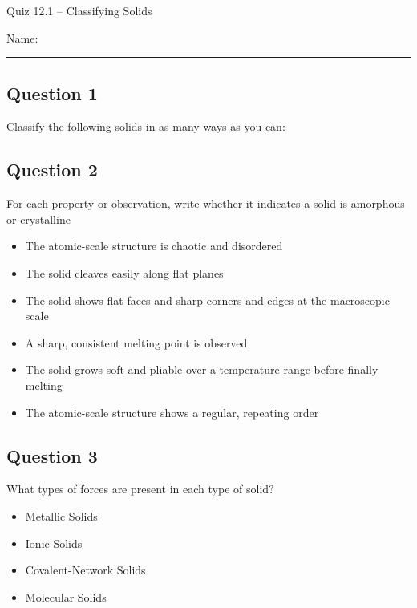 \documentclass[11pt, letterpaper]{memoir}
\begin{document}
	\begin{center}
		{\large	Quiz 12.1 -- Classifying Solids}
	\end{center}
	{\large Name: \rule[-1mm]{4in}{.1pt} 
	
	\subsection*{Question 1}
	Classify the following solids in as many ways as you can:
	
	
	\vspace{3em}
	\subsection*{Question 2}
  For each property or observation, write whether it indicates a solid is amorphous or crystalline

  \begin{itemize}
    \item The atomic-scale structure is chaotic and disordered
    \item The solid cleaves easily along flat planes
    \item The solid shows flat faces and sharp corners and edges at the macroscopic scale
    \item A sharp, consistent melting point is observed
    \item The solid grows soft and pliable over a temperature range before finally melting
    \item The atomic-scale structure shows a regular, repeating order
  \end{itemize}

  \vspace{2em}
  \subsection*{Question 3}
  What types of forces are present in each type of solid?
  \begin{itemize}
    \item Metallic Solids
    \item Ionic Solids
    \item Covalent-Network Solids
    \item Molecular Solids
  \end{itemize}


}
\end{document}
